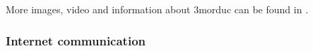 More images, video and information about 3morduc can
be found in \cite{morduc:features}.


\subsubsection{Internet communication}
\label{sec:3morduc:communication}
